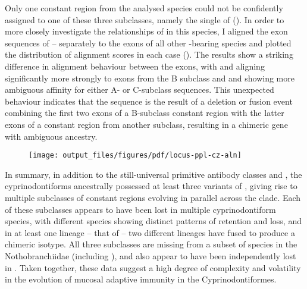 Only one  constant region from the analysed species could not be confidently assigned to one of these three subclasses, namely the single  of  (). In order to more closely investigate the relationships of  in this species, I aligned the exon sequences of  -- separately to the \cz{} exons of all other -bearing species and plotted the distribution of alignment scores in each case (). The results show a striking difference in alignment behaviour between the exons, with  and  aligning significantly more strongly to exons from the B subclass and  and  showing more ambiguous affinity for either A- or C-subclass sequences. This unexpected behaviour indicates that the   sequence is the result of a deletion or fusion event combining the first two exons of a B-subclass  constant region with the latter exons of a constant region from another subclass, resulting in a chimeric gene with ambiguous ancestry.

\begin{figure}
	\centering
	\texttt{[image: output\_files/figures/pdf/locus-ppl-cz-aln]}
	\label{fig:ppl-cz-aln}
\end{figure}
	
In summary, in addition to the still-universal primitive antibody classes  and , the cyprinodontiforms ancestrally possessed at least three variants of , giving rise to multiple subclasses of  constant regions evolving in parallel across the clade. Each of these subclasses appears to have been lost in multiple cyprinodontiform species, with different species showing distinct patterns of retention and loss, and in at least one lineage -- that of  -- two different  lineages have fused to produce a chimeric isotype. All three subclasses are missing from a subset of species in the Nothobranchiidae (including \nfu), and also appear to have been independently lost in . Taken together, these data suggest a high degree of complexity and volatility in the evolution of mucosal adaptive immunity in the Cyprinodontiformes.

